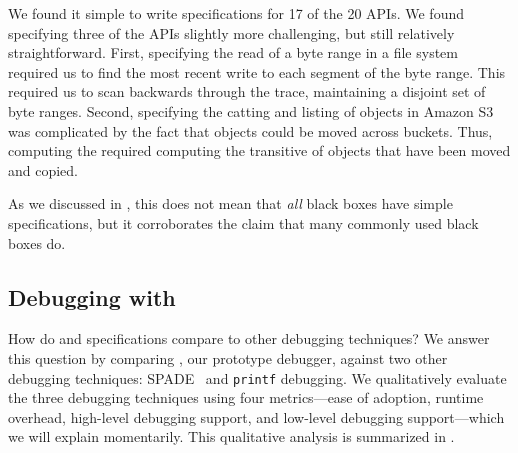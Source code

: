 We found it simple to write \watprovenance{} specifications for 17 of the 20
APIs. We found specifying three of the APIs slightly more challenging, but
still relatively straightforward.
%
First, specifying the read of a byte range in a file system required us to find
the most recent write to each segment of the byte range. This required us to
scan backwards through the trace, maintaining a disjoint set of byte ranges.
%
Second, specifying the catting and listing of objects in Amazon S3 was
complicated by the fact that objects could be moved across buckets. Thus,
computing the \watprovenance{} required computing the transitive
\watprovenance{} of objects that have been moved and copied.


As we discussed in , this does not mean that
\emph{all} black boxes have simple \watprovenance{} specifications, but it
corroborates the claim that many commonly used black boxes do.



\subsection{Debugging with \WatProvenance}
How do \watprovenance{} and \watprovenance{} specifications compare to other
debugging techniques? We answer this question by comparing \fluent{}, our
prototype \watprovenance{} debugger, against two other debugging techniques:
SPADE~\cite{gehani2012spade} and \texttt{printf} debugging. We qualitatively
evaluate the three debugging techniques using four metrics---ease of adoption,
runtime overhead, high-level debugging support, and low-level debugging
support---which we will explain momentarily. This qualitative analysis is
summarized in .

